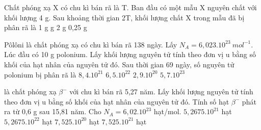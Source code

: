 \begin{vidu}%
 Chất phóng xạ X có chu kì bán rã là T. Ban đầu có một mẫu X nguyên chất với khối lượng 4 g. Sau khoảng thời gian 2T, khối lượng chất X trong mẫu đã bị phân rã là
\choice
{1 g}
{ g}
{2 g}
{0,25 g}
\end{vidu}
\begin{vidu}%
Pôlôni  là chất phóng xạ có chu kì bán rã 138 ngày. Lấy $N_A=6,023.10^{23}\ mol^{-1}$. Lúc đầu có 10 g polonium.  Lấy khối lượng nguyên tử tính theo đơn vị u bằng số khối của hạt nhân của nguyên tử đó. Sau thời gian 69 ngày, số nguyên tử polonium bị phân rã là
\choice
{\True $8,4.10^{21}$}
{$6,5.10^{22}$}
{$2,9.10^{20}$}
{$5,7.10^{23}$}	
\end{vidu}
\begin{vidu}%
 là chất phóng xạ $\beta^-$ với chu kì bán rã 5,27 năm.  Lấy khối lượng nguyên tử tính theo đơn vị u bằng số khối của hạt nhân của nguyên tử đó. Tính số hạt $\beta^-$ phát ra từ 0,6 g  sau 15,81 năm.
Cho $N_A=6,02.10^{23}$ hạt/mol.	
\choice
{\True $5,2675.10^{21}$ hạt}
{$5,2675.10^{22}$ hạt}
{$7,525.10^{20}$ hạt}
{$7,525.10^{21}$ hạt}
\end{vidu}
